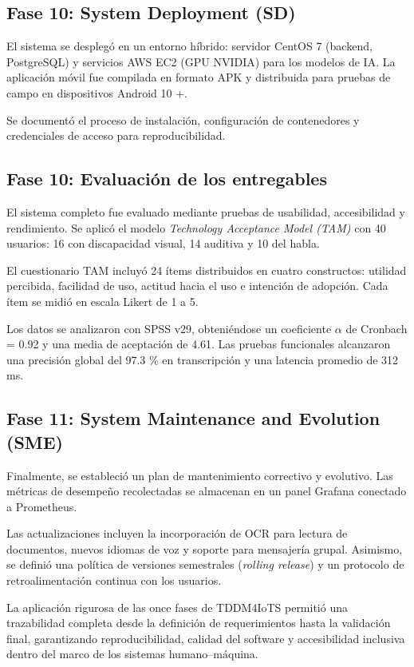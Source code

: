 \documentclass[lettersize,journal]{IEEEtran}
\begin{document}
        \subsection{Fase 10: System Deployment (SD)}
        El sistema se desplegó en un entorno híbrido: servidor CentOS 7 (backend, PostgreSQL) y servicios AWS EC2 (GPU NVIDIA) para los modelos de IA. La aplicación móvil fue compilada en formato APK y distribuida para pruebas de campo en dispositivos Android 10 +.  
        
        Se documentó el proceso de instalación, configuración de contenedores y credenciales de acceso para reproducibilidad.
        
        \subsection{Fase 10: Evaluación de los entregables}
        El sistema completo fue evaluado mediante pruebas de usabilidad, accesibilidad y rendimiento.  Se aplicó el modelo \textit{Technology Acceptance Model (TAM)} con 40 usuarios: 16 con discapacidad visual, 14 auditiva y 10 del habla.
        
        El cuestionario TAM incluyó 24 ítems distribuidos en cuatro constructos: utilidad percibida, facilidad de uso, actitud hacia el uso e intención de adopción.  Cada ítem se midió en escala Likert de 1 a 5.
        
        Los datos se analizaron con SPSS v29, obteniéndose un coeficiente $\alpha$ de Cronbach = 0.92 y una media de aceptación de 4.61. Las pruebas funcionales alcanzaron una precisión global del 97.3 \% en transcripción y una latencia promedio de 312 ms.
            
        \subsection{Fase 11: System Maintenance and Evolution (SME)}
        Finalmente, se estableció un plan de mantenimiento correctivo y evolutivo.  Las métricas de desempeño recolectadas se almacenan en un panel Grafana conectado a Prometheus.
          
        Las actualizaciones incluyen la incorporación de OCR para lectura de documentos, nuevos idiomas de voz y soporte para mensajería grupal.  
        Asimismo, se definió una política de versiones semestrales (\textit{rolling release}) y un protocolo de retroalimentación continua con los usuarios.
        
        \bigskip
        La aplicación rigurosa de las once fases de TDDM4IoTS permitió una trazabilidad completa desde la definición de requerimientos hasta la validación final, garantizando reproducibilidad, calidad del software y accesibilidad inclusiva dentro del marco de los sistemas humano–máquina.
        
\end{document}
